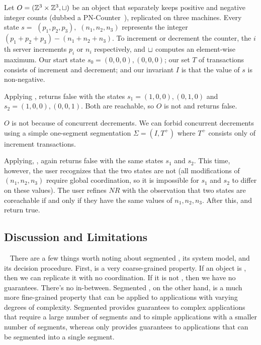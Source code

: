 \begin{example}
  Let $O = (\mathbb{Z}^3 \times \mathbb{Z}^3, \sqcup)$ be an object that separately keeps positive and negative integer counts (dubbed a
  PN-Counter~\cite{shapiro2011comprehensive}), replicated on three machines.
  Every state $s = $ $(p_1, p_2, p_3),$ $(n_1, n_2, n_3)$ represents the
  integer $(p_1 + p_2 + p_3) - (n_1 + n_2 + n_3)$. To increment or decrement
  the counter, the $i$th server increments $p_i$ or $n_i$ respectively, and
  $\sqcup$ computes an element-wise maximum. Our start state $s_0 = (0, 0, 0),
  (0, 0, 0)$; our set $T$ of transactions consists of increment and decrement;
  and our invariant $I$ is that the value of $s$ is non-negative.

  Applying , \IsIclosed{} returns false
  with the states $s_1 = (1, 0, 0), (0, 1, 0)$ and $s_2 = (1, 0, 0), (0, 0,
  1)$. Both are reachable, so $O$ is not \sTIconfluent{} and
   returns false.
  \begin{revisions}
    $O$ is not \sTIconfluent{} because of concurrent decrements. We can forbid
    concurrent decrements using a simple one-segment segmentation $\Sigma = (I,
    T^+)$ where $T^+$ consists only of increment transactions.
  \end{revisions}
  Applying, ,
  \IsIclosed{} again returns false with the same states $s_1$ and $s_2$. This time,
  however, the user recognizes that the two states are not
   (all modifications of $(n_1, n_2, n_3)$ require global
  coordination, so it is impossible for $s_1$ and $s_2$ to differ on these
  values).
  The user refines $NR$ with the observation that two
  states are coreachable if and only if they have the same values of $n_1, n_2,
  n_3$. After this, \IsIclosed{} and
   return true.
\end{example}

\subsection{Discussion and Limitations}~
There are a few things worth noting about segmented \invariantconfluence{}, its
system model, and its decision procedure.
%
First, \invariantconfluence{} is a very coarse-grained property. If an object
is \invariantconfluent{}, then we can replicate it with no coordination. If it
is not \invariantconfluent{}, then we have no guarantees. There's no
in-between.  Segmented \invariantconfluence{}, on the other hand, is a much
more fine-grained property that can be applied to applications with varying
degrees of complexity. Segmented \invariantconfluence{} provides guarantees to
complex applications that require a large number of segments and to simple
applications with a smaller number of segments, whereas \invariantconfluence{}
only provides guarantees to applications that can be segmented into a single
segment.

